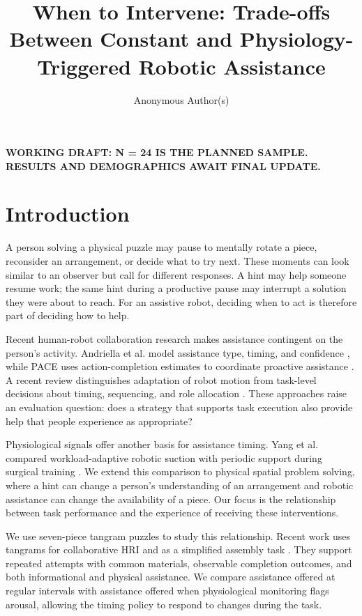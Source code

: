 \documentclass[sigconf,anonymous]{aamas}
\title{When to Intervene: Trade-offs Between Constant and Physiology-Triggered Robotic Assistance}
\author{Anonymous Author(s)}
\begin{document}
\maketitle

\noindent\textbf{WORKING DRAFT: N = 24 IS THE PLANNED SAMPLE. RESULTS AND DEMOGRAPHICS AWAIT FINAL UPDATE.}

\section{Introduction}

A person solving a physical puzzle may pause to mentally rotate a piece, reconsider an arrangement, or decide what to try next. These moments can look similar to an observer but call for different responses. A hint may help someone resume work; the same hint during a productive pause may interrupt a solution they were about to reach. For an assistive robot, deciding when to act is therefore part of deciding how to help.

Recent human-robot collaboration research makes assistance contingent on the person's activity. Andriella et al. model assistance type, timing, and confidence \cite{andriella2025}, while PACE uses action-completion estimates to coordinate proactive assistance \cite{delazzari2025}. A recent review distinguishes adaptation of robot motion from task-level decisions about timing, sequencing, and role allocation \cite{karbouj2026}. These approaches raise an evaluation question: does a strategy that supports task execution also provide help that people experience as appropriate?

Physiological signals offer another basis for assistance timing. Yang et al. compared workload-adaptive robotic suction with periodic support during surgical training \cite{yang2024}. We extend this comparison to physical spatial problem solving, where a hint can change a person's understanding of an arrangement and robotic assistance can change the availability of a piece. Our focus is the relationship between task performance and the experience of receiving these interventions.

We use seven-piece tangram puzzles to study this relationship. Recent work uses tangrams for collaborative HRI and as a simplified assembly task \cite{tabatabaei2025,melo2026}. They support repeated attempts with common materials, observable completion outcomes, and both informational and physical assistance. We compare assistance offered at regular intervals with assistance offered when physiological monitoring flags arousal, allowing the timing policy to respond to changes during the task.
\end{document}
